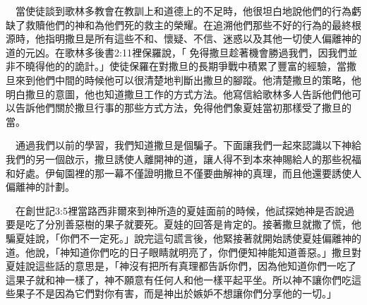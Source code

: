 \documentclass{book}
\begin{document}
\begin{center}
\noindent{}
\end{center}

　當使徒談到歌林多教會在教訓上和道德上的不足時，他很坦白地說他們的行為虧缺了救贖他們的神和為他們死的救主的榮耀。在追溯他們那些不好的行為的最終根源時，他指明撒旦是所有這些不和、懷疑、不信、迷惑以及其他一切使人偏離神的道的元凶。在歌林多後書2:11裡保羅說，「 免得撒旦趁著機會勝過我們，因我們並非不曉得他的的詭計。」使徒保羅在對撒旦的長期爭戰中積累了豐富的經驗，當撒旦來到他們中間的時候他可以很清楚地判斷出撒旦的腳蹤。他清楚撒旦的策略，他明白撒旦的意圖，他也知道撒旦工作的方式方法。他寫信給歌林多人告訴他們他可以告訴他們關於撒旦行事的那些方式方法，免得他們象夏娃當初那樣受了撒旦的當。

　通過我們以前的學習，我們知道撒旦是個騙子。下面讓我們一起來認識以下神給我們的另一個啟示，撒旦誘使人離開神的道，讓人得不到本來神賜給人的那些祝福和好處。伊甸園裡的那一幕不僅證明撒旦不僅要曲解神的真理，而且他還要誘使人偏離神的計劃。

　在創世記3:5裡當路西非爾來到神所造的夏娃面前的時候，他試探她神是否說過要是吃了分別善惡樹的果子就要死。夏娃的回答是肯定的。接著撒旦就撒了慌，他騙夏娃說，「你們不一定死。」說完這句謊言後，他緊接著就開始誘使夏娃偏離神的道。他說，「神知道你們吃的日子眼睛就明亮了，你們便知神能知道善惡。」撒旦對夏娃說這些話的意思是，「神沒有把所有真理都告訴你們，因為他知道你們一吃了這果子就和神一樣了，神不願意有任何人和他一樣平起平坐。所以神不讓你們吃這些果子不是因為它們對你有害，而是神出於嫉妒不想讓你們分享他的一切。」
\end{document}
